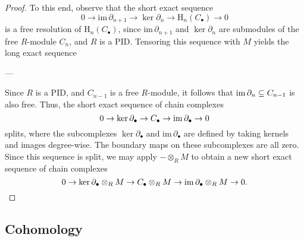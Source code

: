 \begin{proof}
To this end, observe that the short exact sequence
\begin{equation*}
    0 \to \mathrm{im}\, \partial_{n+1} \to \ker \partial_n \to \mathrm{H}_n(C_\bullet) \to 0
\end{equation*}
is a free resolution of $\mathrm{H}_n(C_\bullet)$, since $\mathrm{im}\, \partial_{n+1}$ and $\ker \partial_n$ are submodules of the free $R$-module $C_n$, and $R$ is a PID. Tensoring this sequence with $M$ yields the long exact sequence

---

Since $R$ is a PID, and $C_{n-1}$ is a free $R$-module, it follows that $\operatorname{im} \partial_n \subseteq C_{n-1}$ is also free. Thus, the short exact sequence of chain complexes
\begin{equation*}
    0 \to \ker \partial_\bullet \to C_\bullet \to \operatorname{im} \partial_\bullet \to 0
\end{equation*}
splits, where the subcomplexes $\ker \partial_\bullet$ and $\mathrm{im}\, \partial_\bullet$ are defined by taking kernels and images degree-wise. The boundary maps on these subcomplexes are all zero. Since this sequence is split, we may apply $- \otimes_R M$ to obtain a new short exact sequence of chain complexes
\begin{equation*}
    0 \to \ker \partial_\bullet \otimes_R M \to C_\bullet \otimes_R M \to \operatorname{im} \partial_\bullet \otimes_R M \to 0.
\end{equation*}


\end{proof}

\subsection{Cohomology}

